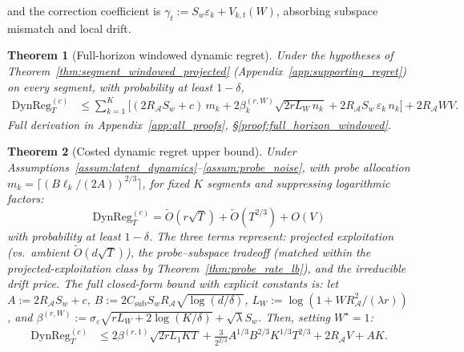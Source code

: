 \documentclass{article}
\newcommand{\cA}{\mathcal{A}}
\newcommand{\DynReg}{\mathrm{DynReg}}
\newtheorem{theorem}{Theorem}
\begin{document}
  \noindent and the correction coefficient is $\gamma_t := S_w\varepsilon_k + V_{k,t}(W)$, absorbing subspace mismatch and local drift.

    \begin{theorem}[Full-horizon windowed dynamic regret]
    \label{thm:full_horizon_windowed}
    Under the hypotheses of Theorem~\ref{thm:segment_windowed_projected} (Appendix~\ref{app:supporting_regret}) on every segment,
    with probability at least $1-\delta$,
    \begin{align*}
    \DynReg_T^{(c)} &\le
      \sum_{k=1}^K \bigl[
        (2R_{\cA}S_w + c)\,m_k
        + 2\beta_k^{(r,W)}\sqrt{2rL_W\, n_k}
        + 2R_{\cA}S_w\,\varepsilon_k\, n_k
      \bigr]
      + 2R_{\cA} W V.
    \end{align*}
    Full derivation in Appendix~\ref{app:all_proofs}, \S\ref{proof:full_horizon_windowed}.
    \end{theorem}


  \begin{theorem}[Costed dynamic regret upper bound]
  \label{thm:closed_dynamic_regret}
  Under Assumptions~\ref{assum:latent_dynamics}--\ref{assum:probe_noise}, with probe allocation
  $m_k = \lceil (B\ell_k/(2A))^{2/3} \rceil$,
  for fixed $K$ segments and suppressing logarithmic factors:
  \begin{equation}
  \boxed{\;
  \DynReg_T^{(c)} = \widetilde O\!\left(r\sqrt{T}\right) + \widetilde O\!\left(T^{2/3}\right) + O(V)
  \;}
  \label{eq:closed_bound_simplified}
  \end{equation}
  with probability at least $1-\delta$. The three terms represent:
  \emph{projected exploitation} (vs.\ ambient $\widetilde O(d\sqrt{T})$),
  the \emph{probe--subspace tradeoff} (matched within the projected-exploitation class by Theorem~\ref{thm:probe_rate_lb}),
  and the \emph{irreducible drift price}.
  The full closed-form bound with explicit constants is:
  let $A := 2R_{\cA} S_w + c$, $B := 2 C_{\mathrm{sub}} S_w R_{\cA} \sqrt{\log(d/\delta)}$,
  $L_W := \log(1+WR_{\cA}^2/(\lambda r))$, and
  $\beta^{(r,W)} := \sigma_\varepsilon\sqrt{rL_W + 2\log(K/\delta)} + \sqrt{\lambda}S_w$.
  Then, setting $W^\star = 1$:
  \begin{align}
  \DynReg_T^{(c)}
  &\le
  2\beta^{(r,1)} \sqrt{2rL_1KT}
  + \frac{3}{2^{2/3}} A^{1/3} B^{2/3} K^{1/3} T^{2/3}
  + 2R_{\cA} V + A K.
  \label{eq:closed_bound_final}
  \end{align}
  \end{theorem}
\end{document}
